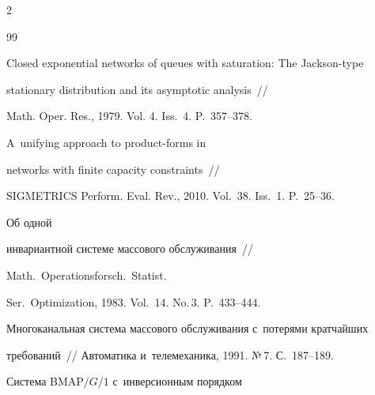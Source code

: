 \begin{multicols}{2}
{{\begin{thebibliography}{99}




Closed exponential networks of queues with saturation: The Jackson-type 


stationary distribution and its asymptotic analysis~//


Math. Oper. Res., 1979. Vol. 4. Iss.~4. P.~357--378.









A~unifying approach to product-forms in


networks with finite capacity constraints~//


SIGMETRICS Perform. Eval. Rev., 2010. Vol.~38. Iss.~1. P.~25--36.







 Об одной


инвариантной системе массового обслуживания~//


Math.\ Operationsforsch.\ Statist.


Ser.\ Optimization, 1983. Vol.~14. No.\,3. P.~433--444.



























Многоканальная система массового обслуживания с~потерями кратчайших 


требований~// Автоматика и~телемеханика, 1991. №\,7. С.~187--189.










 Система BMAP${/G/1}$ с~инверсионным порядком 



\end{thebibliography}}}
\end{multicols}
